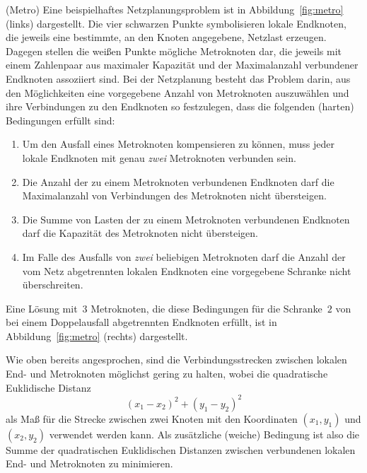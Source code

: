 \documentclass[a4paper,12pt,ngerman]{article}
\begin{document}
\begin{PraktikumsAufgabe}{2}{(Metro)}
\noindent
Eine beispielhaftes Netzplanungsproblem ist in Abbildung~\ref{fig:metro} (links) dargestellt.
Die vier schwarzen Punkte symbolisieren lokale Endknoten, die jeweils eine bestimmte, an
den            Knoten angegebene, Netzlast erzeugen.
Dagegen stellen die weißen Punkte mögliche Metroknoten dar, die jeweils mit einem Zahlenpaar
aus maximaler Kapazität und der Maximalanzahl verbundener Endknoten assoziiert sind.
Bei der Netzplanung besteht das Problem darin, aus den Möglichkeiten eine vorgegebene Anzahl
von Metroknoten auszuwählen und ihre Verbindungen zu den Endknoten so festzulegen,
dass die folgenden (harten) Bedingungen erfüllt sind:
\vspace{-3mm}
\begin{enumerate}\itemsep-3pt
  \item Um den Ausfall eines Metroknoten kompensieren zu können,
        muss jeder lokale Endknoten mit genau \emph{zwei} Metroknoten verbunden sein.
  \item Die Anzahl der zu einem Metroknoten verbundenen Endknoten darf        die Maximal\-anzahl
        von Verbindungen des Metroknoten nicht übersteigen.
  \item Die Summe von Lasten der zu einem Metroknoten verbundenen Endknoten darf       die Kapazität
        des Metroknoten nicht übersteigen.
  \item Im Falle des Ausfalls von \emph{zwei} beliebigen Metroknoten
        darf   die Anzahl der vom Netz abgetrennten lokalen Endknoten eine 
        vorgegebene Schranke nicht überschreiten.
\end{enumerate}
\vspace{-3mm}
Eine L\"osung mit~$3$ Metroknoten, die diese      Bedingungen f\"ur die Schranke~$2$ von 
bei einem Doppelausfall
abgetrennten   Endknoten erf\"ullt, ist in Abbildung~\ref{fig:metro} (rechts) dargestellt.

\noindent
Wie oben bereits angesprochen, sind die Verbindungsstrecken zwischen lokalen End- und
Metroknoten m\"oglichst gering zu halten,
wobei die quadratische 
          Euklidische Distanz $$      (x_1{-}x_2)^2+(y_1{-}y_2)^2 $$ als Maß f\"ur
die Strecke zwischen zwei Knoten mit den Koordinaten $(x_1,y_1)$ und $(x_2,y_2)$ verwendet
werden kann.
Als zusätzliche (weiche) Bedingung ist also
die Summe der quadratischen 
              Euklidischen Distanzen zwischen verbundenen lokalen End- und Metroknoten 
zu minimieren.%


\end{PraktikumsAufgabe}
\end{document}
